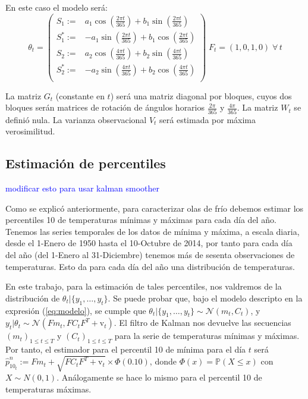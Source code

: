 \documentclass[12pt]{article}\usepackage[]{graphicx}\usepackage[]{color}
\newcommand{\p}{\mathbb{P}}
\begin{document}
En este caso el modelo será:
$$\theta_t=\left(\begin{array}{lr}
S_1:=& a_1\cos\left(\frac{2\pi t}{365}\right) + b_1 \sin\left(\frac{2\pi t}{365}\right) \\
S_1^*:=& -a_1\sin\left(\frac{2\pi t}{365}\right) + b_1 \cos\left(\frac{2\pi t}{365}\right) \\
S_2:= &a_2\cos\left(\frac{4\pi t}{365}\right) + b_2 \sin\left(\frac{4\pi t}{365}\right) \\
S_2^*:=& -a_2\sin\left(\frac{4\pi t}{365}\right) + b_2 \cos\left(\frac{4\pi t}{365}\right) \\
\end{array}\right)\; F_t=(1,0,1,0) \; \forall \, t$$

La matriz $G_t$ (constante en $t$) será una matriz diagonal por bloques, cuyos dos bloques serán matrices de rotación de ángulos horarios $\frac{2\pi}{365}$ y $\frac{4\pi}{365}$. La matriz $W_t$ se definió nula. La varianza observacional $V_t$ será estimada por máxima verosimilitud.

\subsection{Estimación de percentiles}
\textcolor{blue}{modificar esto para usar kalman smoother}

Como se explicó anteriormente, para caracterizar olas de frío debemos estimar los percentiles 10 de temperaturas mínimas y máximas para cada día del año. Tenemos las series temporales de los datos de mínima y máxima, a escala diaria, desde el 1-Enero de 1950 hasta el 10-Octubre de 2014, por tanto para cada día del año (del 1-Enero al 31-Diciembre) tenemos más de sesenta observaciones de temperaturas. Esto da para cada día del año una distribución de temperaturas.  %

En este trabajo, para la estimación de tales percentiles, nos valdremos de la distribución de $\theta_t | \{y_1,\dots,y_t\}$. Se puede probar que, bajo el modelo descripto en la expresión (\ref{eq:modelo}), se cumple que $\theta_t | \{y_1,\dots,y_t\} \sim \mathcal{N}(m_t,C_t)$, y $y_t|\theta_t \sim \mathcal{N}(Fm_t,FC_tF^T + \text{v}_t)$. El filtro de Kalman nos devuelve las secuencias $(m_t)_{1\leq t \leq T}$ y $(C_t)_{1\leq t \leq T}$ para la serie de temperaturas mínimas y máximas. Por tanto, el estimador para el percentil 10 de mínima para el día $t$ será $\hat{p}^n_{10_t}:=Fm_t+\sqrt{FC_tF^T + \text{v}_t}\times \Phi(0.10)$, donde $\Phi(x)=\p(X\leq x)$ con $X\sim N(0,1)$. Análogamente se hace lo mismo para el percentil 10 de temperaturas máximas.
\end{document}
